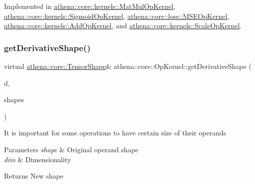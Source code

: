 Implemented in \mbox{\hyperlink{classathena_1_1core_1_1kernels_1_1_mat_mul_op_kernel_a42d08b8004e8033e01988eb2392215c8}{athena\+::core\+::kernels\+::\+Mat\+Mul\+Op\+Kernel}}, \mbox{\hyperlink{classathena_1_1core_1_1kernels_1_1_sigmoid_op_kernel_a38166ae2204692353efa2f6270714a80}{athena\+::core\+::kernels\+::\+Sigmoid\+Op\+Kernel}}, \mbox{\hyperlink{classathena_1_1core_1_1loss_1_1_m_s_e_op_kernel_a936002563d3ef3a029bbeecbdbd3a509}{athena\+::core\+::loss\+::\+M\+S\+E\+Op\+Kernel}}, \mbox{\hyperlink{classathena_1_1core_1_1kernels_1_1_add_op_kernel_ae318f1b376859d8177c401de17ca956a}{athena\+::core\+::kernels\+::\+Add\+Op\+Kernel}}, and \mbox{\hyperlink{classathena_1_1core_1_1kernels_1_1_scale_op_kernel_ad35869239968db73049161acbad05aab}{athena\+::core\+::kernels\+::\+Scale\+Op\+Kernel}}.

\mbox{\label{classathena_1_1core_1_1_op_kernel_ad95af6dd184ce7ee9182ec7ca54b6c4d}} 
\subsubsection{\texorpdfstring{get\+Derivative\+Shape()}{getDerivativeShape()}}
{\footnotesize\ttfamily virtual \mbox{\hyperlink{classathena_1_1core_1_1_tensor_shape}{athena\+::core\+::\+Tensor\+Shape}}\& athena\+::core\+::\+Op\+Kernel\+::get\+Derivative\+Shape (\begin{DoxyParamCaption}\item[{int}]{d,  }\item[{std\+::vector$<$ \mbox{\hyperlink{classathena_1_1core_1_1_tensor_shape}{athena\+::core\+::\+Tensor\+Shape}} $>$ \&}]{shapes }\end{DoxyParamCaption})\hspace{0.3cm}{\ttfamily [pure virtual]}}

It is important for some operations to have certain size of their operands 
\begin{DoxyParams}{Parameters}
{\em shape} & Original operand shape \\
\hline
{\em dim} & Dimensionality \\
\hline
\end{DoxyParams}
\begin{DoxyReturn}{Returns}
New shape 
\end{DoxyReturn}


